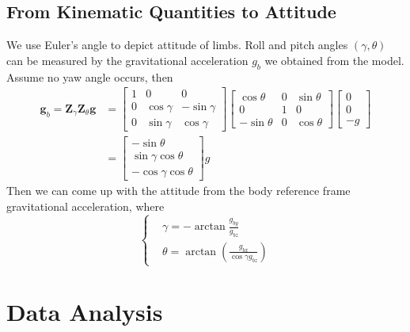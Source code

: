 \documentclass[12pt]{article}
\begin{document}
    \subsection{From Kinematic Quantities to Attitude}
    We use Euler's angle to depict attitude of limbs.  Roll and pitch angles $(\gamma, \theta)$ can be measured by the gravitational acceleration $g_b$ we obtained from the model. Assume no yaw angle occurs, then
    \begin{equation}
    \begin{aligned}
        \bm{g}_b = \bm{Z}_{\gamma} \bm{Z}_{\theta} \bm{g}
        &= \begin{bmatrix}
            1 & 0 & 0 \\
            0 & \cos \gamma & -\sin \gamma \\
            0 & \sin \gamma & \cos \gamma
        \end{bmatrix} \begin{bmatrix}
            \cos \theta & 0 & \sin \theta \\
            0 & 1 & 0\\
            -\sin \theta & 0 & \cos \theta
        \end{bmatrix} 
        \begin{bmatrix}
            0 \\ 0 \\ -g
        \end{bmatrix} \\
        &= \begin{bmatrix}
            -\sin \theta \\ \sin \gamma \cos \theta \\ -\cos \gamma \cos \theta 
        \end{bmatrix} g
    \end{aligned}
    \end{equation}
    Then we can come up with the attitude from the body reference frame gravitational acceleration, where
    \begin{equation}
        \left\{ \begin{aligned} &\gamma = -\arctan \frac{g_{by}}{g_{bz}}  \\
            & \theta = \arctan \left( \frac{g_{bx}}{\cos \gamma g_{bz}}\right) \end{aligned} \right.
    \end{equation}
    \section{Data Analysis}
\end{document}
